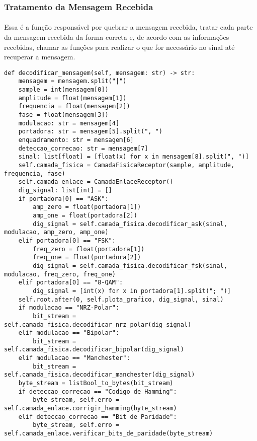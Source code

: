 \documentclass[12pt, a4paper]{article}
\newenvironment{code}{\captionsetup{type=listing}}{}
\begin{document}
\subsubsection{Tratamento da Mensagem Recebida}
\paragraph{}
Essa é a função responsável por quebrar a mensagem recebida, tratar cada parte da mensagem recebida da forma correta e, de acordo com as informações recebidas, chamar as funções para realizar o que for necessário no sinal até recuperar a mensagem.

\begin{code}
\begin{verbatim}
def decodificar_mensagem(self, mensagem: str) -> str:
    mensagem = mensagem.split("|")
    sample = int(mensagem[0])
    amplitude = float(mensagem[1])
    frequencia = float(mensagem[2])
    fase = float(mensagem[3])
    modulacao: str = mensagem[4]
    portadora: str = mensagem[5].split(", ")
    enquadramento: str = mensagem[6]
    deteccao_correcao: str = mensagem[7]
    sinal: list[float] = [float(x) for x in mensagem[8].split(", ")]
    self.camada_fisica = CamadaFisicaReceptor(sample, amplitude, frequencia, fase)
    self.camada_enlace = CamadaEnlaceReceptor()
    dig_signal: list[int] = []
    if portadora[0] == "ASK":
        amp_zero = float(portadora[1])
        amp_one = float(portadora[2])
        dig_signal = self.camada_fisica.decodificar_ask(sinal, modulacao, amp_zero, amp_one)
    elif portadora[0] == "FSK":
        freq_zero = float(portadora[1])
        freq_one = float(portadora[2])
        dig_signal = self.camada_fisica.decodificar_fsk(sinal, modulacao, freq_zero, freq_one)
    elif portadora[0] == "8-QAM":
        dig_signal = [int(x) for x in portadora[1].split("; ")]
    self.root.after(0, self.plota_grafico, dig_signal, sinal)
    if modulacao == "NRZ-Polar":
        bit_stream = self.camada_fisica.decodificar_nrz_polar(dig_signal)
    elif modulacao == "Bipolar":
        bit_stream = self.camada_fisica.decodificar_bipolar(dig_signal)
    elif modulacao == "Manchester":
        bit_stream = self.camada_fisica.decodificar_manchester(dig_signal)
    byte_stream = listBool_to_bytes(bit_stream)
    if deteccao_correcao == "Codigo de Hamming":
        byte_stream, self.erro = self.camada_enlace.corrigir_hamming(byte_stream)
    elif deteccao_correcao == "Bit de Paridade":
        byte_stream, self.erro = self.camada_enlace.verificar_bits_de_paridade(byte_stream)

\end{verbatim}
\end{code}
\end{document}
